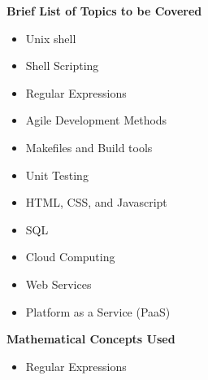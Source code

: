{    \noindent \textbf{Brief List of Topics to be Covered}
    \begin{itemize}
        \item Unix shell
        \item Shell Scripting
        \item Regular Expressions
        \item Agile Development Methods
        \item Makefiles and Build tools
        \item Unit Testing
        \item HTML, CSS, and Javascript
        \item SQL
        \item Cloud Computing
        \item Web Services
        \item Platform as a Service (PaaS)
    \end{itemize}
    
    \noindent \textbf{Mathematical Concepts Used}
    \begin{itemize}
        \item Regular Expressions
    \end{itemize}
}

